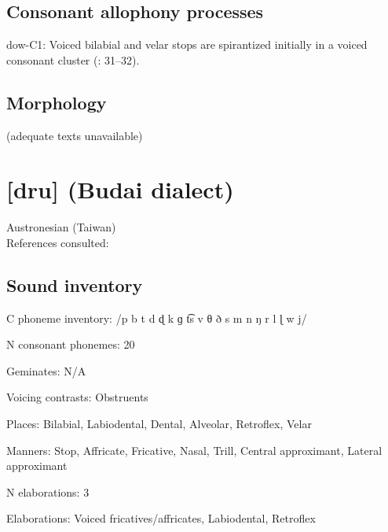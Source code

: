 {\subsection*{Consonant allophony processes}
\begin{appendixdesc}

\item[dow-C1:] Voiced bilabial and velar stops are spirantized initially in a voiced consonant cluster (\citealt{WieringWiering1994}: 31--32).
\end{appendixdesc}
\subsection*{Morphology}

(adequate texts unavailable)

\newpage\section*{[dru]  (Budai dialect)}   %
Austronesian (Taiwan)\medskip\\
References consulted: \citet{Chen2006}

\subsection*{Sound inventory}
\begin{appendixdesc}

\item[C phoneme inventory:] /p b t d ɖ k ɡ t͡s v θ ð s m n ŋ r l ɭ w j/

\item[N consonant phonemes:] 20

\item[Geminates:] N/A

\item[Voicing contrasts:] Obstruents

\item[Places:] Bilabial, Labiodental, Dental, Alveolar, Retroflex, Velar

\item[Manners:] Stop, Affricate, Fricative, Nasal, Trill, Central approximant, Lateral approximant

\item[N elaborations:] 3

\item[Elaborations:] Voiced fricatives/affricates, Labiodental, Retroflex


\end{appendixdesc}}
